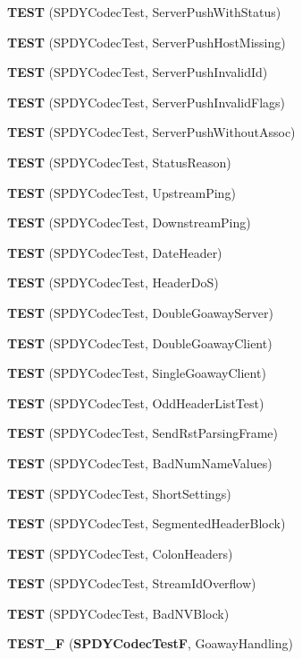 \begin{DoxyCompactItemize}
{\bf T\+E\+ST} (S\+P\+D\+Y\+Codec\+Test, Server\+Push\+With\+Status)
\item 
{\bf T\+E\+ST} (S\+P\+D\+Y\+Codec\+Test, Server\+Push\+Host\+Missing)
\item 
{\bf T\+E\+ST} (S\+P\+D\+Y\+Codec\+Test, Server\+Push\+Invalid\+Id)
\item 
{\bf T\+E\+ST} (S\+P\+D\+Y\+Codec\+Test, Server\+Push\+Invalid\+Flags)
\item 
{\bf T\+E\+ST} (S\+P\+D\+Y\+Codec\+Test, Server\+Push\+Without\+Assoc)
\item 
{\bf T\+E\+ST} (S\+P\+D\+Y\+Codec\+Test, Status\+Reason)
\item 
{\bf T\+E\+ST} (S\+P\+D\+Y\+Codec\+Test, Upstream\+Ping)
\item 
{\bf T\+E\+ST} (S\+P\+D\+Y\+Codec\+Test, Downstream\+Ping)
\item 
{\bf T\+E\+ST} (S\+P\+D\+Y\+Codec\+Test, Date\+Header)
\item 
{\bf T\+E\+ST} (S\+P\+D\+Y\+Codec\+Test, Header\+DoS)
\item 
{\bf T\+E\+ST} (S\+P\+D\+Y\+Codec\+Test, Double\+Goaway\+Server)
\item 
{\bf T\+E\+ST} (S\+P\+D\+Y\+Codec\+Test, Double\+Goaway\+Client)
\item 
{\bf T\+E\+ST} (S\+P\+D\+Y\+Codec\+Test, Single\+Goaway\+Client)
\item 
{\bf T\+E\+ST} (S\+P\+D\+Y\+Codec\+Test, Odd\+Header\+List\+Test)
\item 
{\bf T\+E\+ST} (S\+P\+D\+Y\+Codec\+Test, Send\+Rst\+Parsing\+Frame)
\item 
{\bf T\+E\+ST} (S\+P\+D\+Y\+Codec\+Test, Bad\+Num\+Name\+Values)
\item 
{\bf T\+E\+ST} (S\+P\+D\+Y\+Codec\+Test, Short\+Settings)
\item 
{\bf T\+E\+ST} (S\+P\+D\+Y\+Codec\+Test, Segmented\+Header\+Block)
\item 
{\bf T\+E\+ST} (S\+P\+D\+Y\+Codec\+Test, Colon\+Headers)
\item 
{\bf T\+E\+ST} (S\+P\+D\+Y\+Codec\+Test, Stream\+Id\+Overflow)
\item 
{\bf T\+E\+ST} (S\+P\+D\+Y\+Codec\+Test, Bad\+N\+V\+Block)
\item 
{\bf T\+E\+S\+T\+\_\+F} ({\bf S\+P\+D\+Y\+Codec\+TestF}, Goaway\+Handling)
\end{DoxyCompactItemize}
